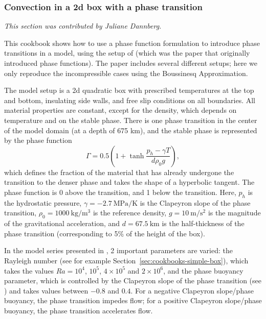 \subsubsection{Convection in a 2d box with a phase transition}
\label{sec:cookbooks-phase-function}

\textit{This section was contributed by Juliane Dannberg.}

This cookbook shows how to use a phase function formulation to introduce phase transitions in a model, using the setup of \cite{CY85} (which was the paper that originally introduced phase functions). The paper includes several different setups; here we only reproduce the incompressible cases using the Boussinesq Approximation.  

The model setup is a 2d quadratic box with prescribed temperatures at the top and bottom, insulating side walls, and free slip conditions on all boundaries. All material properties are constant, except for the density, which depends on temperature and on the stable phase. There is one phase transition in the center of the model domain (at a depth of 675 km), and the stable phase is represented by the phase function
\begin{equation}
  \Gamma = 0.5 \left(1 + \tanh \frac{p_h - \gamma T}{d \rho_0 g} \right), 
\end{equation}
which defines the fraction of the material that has already undergone the transition to the denser phase and takes the shape of a hyperbolic tangent. The phase function is 0 above the transition, and 1 below the transition. Here, $p_h$ is the hydrostatic pressure, $\gamma = -2.7~\si{\mega\pascal\per\kelvin}$ is the Clapeyron slope of the phase transition, $\rho_0 = 1000~\si{\kg\per\cubic\meter}$ is the reference density, $g = 10~\si{\metre\per\square\second}$ is the magnitude of the gravitational acceleration, and $d = 67.5~\si{\km}$ is the half-thickness of the phase transition (corresponding to 5\% of the height of the box). 

In the model series presented in \cite{CY85}, 2 important parameters are varied: the Rayleigh number (see for example Section~\ref{sec:cookbooks-simple-box}), which takes the values $Ra = 10^4$, $10^5$, $4 \times 10^5$ and $2 \times 10^6$, and the phase buoyancy parameter, which is controlled by the Clapeyron slope of the phase transition (see \cite{CY85}) and takes values between $-0.8$ and $0.4$. For a negative Clapeyron slope/phase buoyancy, the phase transition impedes flow; for a positive Clapeyron slope/phase buoyancy, the phase transition accelerates flow. 


